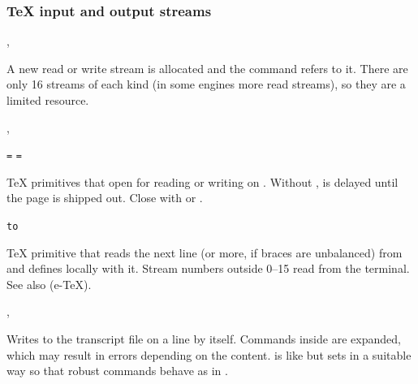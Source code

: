 \documentclass{l3in2edoc}
\begin{document}
\subsubsection{\TeX{} input and output streams}

\begin{function}[]
  {
    \newread,
    \newwrite
  }
  \begin{syntax}
     
  \end{syntax}

  A new read or write stream is allocated and the command 
  refers to it. There are only 16 streams of each kind (in some
  engines more read streams), so they are a limited resource.

\end{function}


\begin{function}[]
  {
    \openin,
    \openout
  }
  \begin{syntax}
      \texttt{=} 
      \texttt{=} 
  \end{syntax}
  \TeX{} primitives that open  for reading or writing on
  . Without ,  is delayed until
  the page is shipped out. Close with  or .
\end{function}

\begin{function}[]
  {
    \read
  }
  \begin{syntax}
      \texttt{to} 
  \end{syntax}
  \TeX{} primitive that reads the next line (or more, if braces are
  unbalanced) from  and defines  locally with
  it. Stream numbers outside 0--15 read from the terminal. See also
   (e-\TeX{}).
\end{function}


\begin{function}[]
  {
    \wlog,
    \protected@wlog
  }
  \begin{syntax}
     
  \end{syntax}
  Writes  to the transcript file on a line by
  itself. Commands inside  are expanded, which may
  result in errors depending on the content.  is
  like  but sets  in a suitable way so that
  robust commands behave as in .
\end{function}
\end{document}
